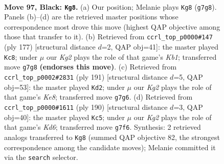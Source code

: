 \documentclass[11pt]{article}
\begin{document}
\clearpage

\begin{figure}[p]\centering
\begin{subfigure}{0.46\textwidth}\centering
\resizebox{\linewidth}{!}{%
\newchessgame
\chessboard[
  setfen={8/1R4k1/8/8/8/7K/5p2/3r4 b - - 9 97},
  showmover=false,
  pgfstyle=straightmove, color=movearrow, markmove={g7-g8}
]}
\caption{}
\end{subfigure}\hfill
\begin{subfigure}{0.46\textwidth}\centering
\resizebox{\linewidth}{!}{%
\newchessgame
\chessboard[
  setfen={1k6/8/8/1R6/2r5/8/4K3/8 b - - 9 89},
  showmover=false,
  pgfstyle=straightmove, color=movearrow, markmove={b8-c8}
]}
\caption{}
\end{subfigure}
\\[4pt]
\begin{subfigure}{0.46\textwidth}\centering
\resizebox{\linewidth}{!}{%
\newchessgame
\chessboard[
  setfen={8/7r/8/8/4p3/4P3/6K1/R3k3 b - - 13 96},
  showmover=false,
  pgfstyle=straightmove, color=movearrow, markmove={e1-d2}
]}
\caption{}
\end{subfigure}\hfill
\begin{subfigure}{0.46\textwidth}\centering
\resizebox{\linewidth}{!}{%
\newchessgame
\chessboard[
  setfen={3k4/7R/3K2r1/8/3P4/8/8/8 w - - 19 96},
  showmover=false,
  pgfstyle=straightmove, color=movearrow, markmove={d6-c5}
]}
\caption{}
\end{subfigure}
\caption{\textbf{Move 97, Black: \texttt{Kg8}.} (a) Our position; Melanie plays \texttt{Kg8} (\texttt{g7g8}). Panels (b)--(d) are the retrieved master positions whose correspondence most drove this move (highest QAP objective among those that transfer to it). (b) Retrieved from \texttt{ccrl\_top\_p0000\#147} (ply 177) [structural distance $d$=2, QAP obj=41]: the master played \texttt{Kc8}; under $\mu$ our \emph{Kg2} plays the role of that game's \emph{Kb1}; transferred move \texttt{g7g8} \textbf{(endorses this move)}. (c) Retrieved from \texttt{ccrl\_top\_p0002\#2831} (ply 191) [structural distance $d$=5, QAP obj=53]: the master played \texttt{Kd2}; under $\mu$ our \emph{Kg2} plays the role of that game's \emph{Ke8}; transferred move \texttt{g7g6}. (d) Retrieved from \texttt{ccrl\_top\_p0000\#1611} (ply 190) [structural distance $d$=3, QAP obj=40]: the master played \texttt{Kc5}; under $\mu$ our \emph{Kg2} plays the role of that game's \emph{Kd6}; transferred move \texttt{g7f6}. Synthesis: 2 retrieved analogs transferred to \texttt{Kg8} (summed QAP objective 82, the strongest correspondence among the candidate moves); Melanie committed it via the \texttt{search} selector.}
\label{fig:thought-m193}
\end{figure}
\end{document}
